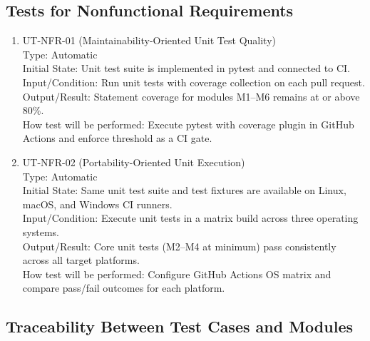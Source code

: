 \documentclass[12pt, titlepage]{article}
\begin{document}
\subsection{Tests for Nonfunctional Requirements}

\begin{enumerate}

\item{UT-NFR-01 (Maintainability-Oriented Unit Test Quality)\\}
    Type: Automatic \\
    Initial State: Unit test suite is implemented in pytest and connected to CI. \\
    Input/Condition: Run unit tests with coverage collection on each pull request. \\
    Output/Result: Statement coverage for modules M1--M6 remains at or above 80\%. \\
    How test will be performed: Execute pytest with coverage plugin in GitHub Actions and enforce threshold as a CI gate.

\item{UT-NFR-02 (Portability-Oriented Unit Execution)\\}
    Type: Automatic \\
    Initial State: Same unit test suite and test fixtures are available on Linux, macOS, and Windows CI runners. \\
    Input/Condition: Execute unit tests in a matrix build across three operating systems. \\
    Output/Result: Core unit tests (M2--M4 at minimum) pass consistently across all target platforms. \\
    How test will be performed: Configure GitHub Actions OS matrix and compare pass/fail outcomes for each platform.

\end{enumerate}




\subsection{Traceability Between Test Cases and Modules}
\end{document}
